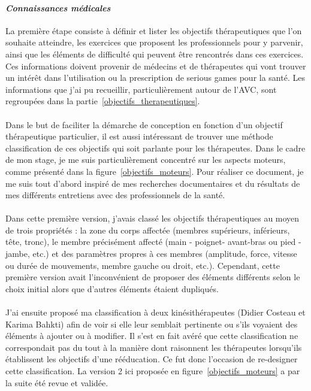 			\paragraph{\emph{Connaissances médicales}\\}
La première étape consiste à définir et lister les objectifs thérapeutiques que l’on souhaite atteindre, les exercices que proposent les professionnels pour y parvenir, ainsi que les éléments de difficulté qui peuvent être rencontrés dans ces exercices. Ces informations doivent provenir de médecins et de thérapeutes qui vont trouver un intérêt dans l’utilisation ou la prescription de serious games pour la santé. Les informations que j'ai pu recueillir, particulièrement autour de l'AVC, sont regroupées dans la partie~\ref{objectifs_therapeutiques}.

\paragraph{}
Dans le but de faciliter la démarche de conception en fonction d’un objectif thérapeutique particulier, il est aussi intéressant de trouver une méthode classification de ces objectifs qui soit parlante pour les thérapeutes. Dans le cadre de mon stage, je me suis particulièrement concentré sur les aspects moteurs, comme présenté dans la figure~\ref{objectifs_moteurs}. Pour réaliser ce document, je me suis tout d'abord inspiré de mes recherches documentaires et du résultats de mes différents entretiens avec des professionnels de la santé.

\paragraph{}
Dans cette première version, j'avais classé les objectifs thérapeutiques au moyen de trois propriétés : la zone du corps affectée (membres supérieurs, inférieurs, tête, tronc), le membre précisément affecté (main - poignet- avant-bras ou pied - jambe, etc.) et des paramètres propres à ces membres (amplitude, force, vitesse ou durée de mouvements, membre gauche ou droit, etc.). Cependant, cette première version avait l'inconvénient de proposer des éléments différents selon le choix initial alors que d'autres éléments étaient dupliqués.

\paragraph{}J'ai ensuite proposé ma classification à deux kinésithérapeutes (Didier Costeau et Karima Bahkti) afin de voir si elle leur semblait pertinente ou s'ils voyaient des éléments à ajouter ou à modifier. Il s'est en fait avéré que cette classification ne correspondait pas du tout à la manière dont raisonnent les thérapeutes lorsqu'ils établissent les objectifs d'une rééducation. Ce fut donc l'occasion de re-designer cette classification. La version 2 ici proposée en figure~\ref{objectifs_moteurs} a par la suite été revue et validée.

